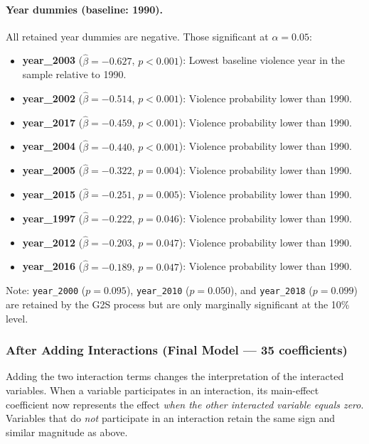 \documentclass[12pt,a4paper]{article}
\begin{document}
\paragraph{Year dummies (baseline: 1990).}
All retained year dummies are negative. Those significant at $\alpha = 0.05$:
\begin{itemize}
  \item \textbf{year\_2003} ($\hat{\beta} = -0.627$, $p < 0.001$): Lowest baseline violence year in the sample relative to 1990.
  \item \textbf{year\_2002} ($\hat{\beta} = -0.514$, $p < 0.001$): Violence probability lower than 1990.
  \item \textbf{year\_2017} ($\hat{\beta} = -0.459$, $p < 0.001$): Violence probability lower than 1990.
  \item \textbf{year\_2004} ($\hat{\beta} = -0.440$, $p < 0.001$): Violence probability lower than 1990.
  \item \textbf{year\_2005} ($\hat{\beta} = -0.322$, $p = 0.004$): Violence probability lower than 1990.
  \item \textbf{year\_2015} ($\hat{\beta} = -0.251$, $p = 0.005$): Violence probability lower than 1990.
  \item \textbf{year\_1997} ($\hat{\beta} = -0.222$, $p = 0.046$): Violence probability lower than 1990.
  \item \textbf{year\_2012} ($\hat{\beta} = -0.203$, $p = 0.047$): Violence probability lower than 1990.
  \item \textbf{year\_2016} ($\hat{\beta} = -0.189$, $p = 0.047$): Violence probability lower than 1990.
\end{itemize}
Note: \texttt{year\_2000} ($p = 0.095$), \texttt{year\_2010} ($p = 0.050$), and \texttt{year\_2018} ($p = 0.099$) are retained by the G2S process but are only marginally significant at the 10\% level.

\subsubsection{After Adding Interactions (Final Model --- 35 coefficients)}

Adding the two interaction terms changes the interpretation of the interacted variables. When a variable participates in an interaction, its main-effect coefficient now represents the effect \emph{when the other interacted variable equals zero}. Variables that do \emph{not} participate in an interaction retain the same sign and similar magnitude as above.
\end{document}
